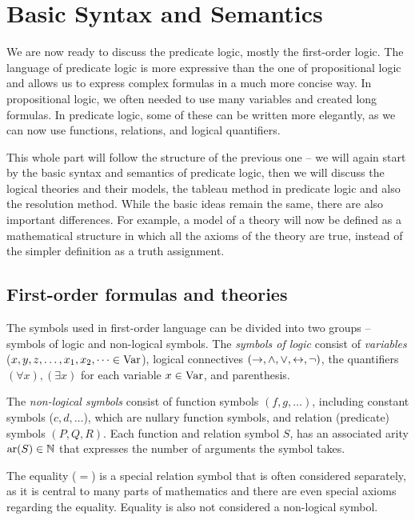
\chapter{Basic Syntax and Semantics}

We are now ready to discuss the predicate logic, mostly the first-order logic. The language of predicate logic is more expressive than the one of propositional logic and allows us to express complex formulas in a much more concise way. In propositional logic, we often needed to use many variables and created long formulas. In predicate logic, some of these can be written more elegantly, as we can now use functions, relations, and logical quantifiers.

This whole part will follow the structure of the previous one -- we will again start by the basic syntax and semantics of predicate logic, then we will discuss the logical theories and their models, the tableau method in predicate logic and also the resolution method. While the basic ideas remain the same, there are also important differences. For example, a model of a theory will now be defined as a mathematical structure in which all the axioms of the theory are true, instead of the simpler definition as a truth assignment.

\section{First-order formulas and theories}

The symbols used in first-order language can be divided into two groups -- symbols of logic and non-logical symbols. The \emph{symbols of logic} consist of \emph{variables} ($x, y, z, \dots, x_1, x_2, \dots \in \operatorname{Var}$), logical connectives $(\to, \land, \lor, \leftrightarrow, \neg)$, the quantifiers $(\forall x), (\exists x)$ for each variable $x \in \operatorname{Var}$, and parenthesis. 

The \emph{non-logical symbols} consist of function symbols $(f, g, \dots)$, including constant symbols ($c, d, \dots$), which are nullary function symbols, and relation (predicate) symbols $(P, Q, R)$. Each function and relation symbol $S$, has an associated arity $\operatorname{ar}(S)\in\mathbb{N}$ that expresses the number of arguments the symbol takes. 

The equality ($=$) is a special relation symbol that is often considered separately, as it is central to many parts of mathematics and there are even special axioms regarding the equality. Equality is also not considered a non-logical symbol.


